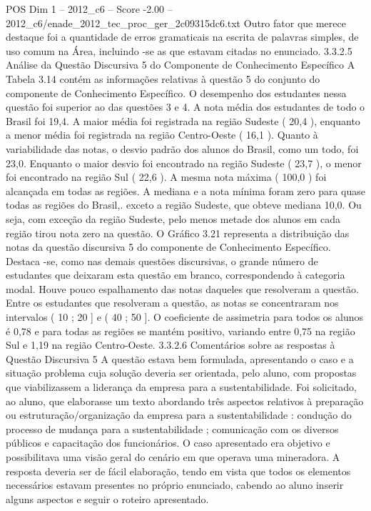 \begin{textsample}{POS Dim 1 – 2012\_c6 – Score -2.00 – 2012\_c6/enade\_2012\_tec\_proc\_ger\_2c09315dc6.txt}
Outro fator que merece destaque foi a quantidade de erros gramaticais na escrita de palavras simples, de uso comum na Área, incluindo -se as que estavam citadas no enunciado. 3.3.2.5 Análise da Questão Discursiva 5 do Componente de Conhecimento Específico A Tabela 3.14 contém as informações relativas à questão 5 do conjunto do componente de Conhecimento Específico.
O desempenho dos estudantes nessa questão foi superior ao das questões 3 e 4.
A nota média dos estudantes de todo o Brasil foi 19,4.
A maior média foi registrada na região Sudeste ( 20,4 ), enquanto a menor média foi registrada na região Centro-Oeste ( 16,1 ).
Quanto à variabilidade das notas, o desvio padrão dos alunos do Brasil, como um todo, foi 23,0.
Enquanto o maior desvio foi encontrado na região Sudeste ( 23,7 ), o menor foi encontrado na região Sul ( 22,6 ).
A mesma nota máxima ( 100,0 ) foi alcançada em todas as regiões.
A mediana e a nota mínima foram zero para quase todas as regiões do Brasil,. exceto a região Sudeste, que obteve mediana 10,0.
Ou seja, com exceção da região Sudeste, pelo menos metade dos alunos em cada região tirou nota zero na questão.
O Gráfico 3.21 representa a distribuição das notas da questão discursiva 5 do componente de Conhecimento Específico.
Destaca -se, como nas demais questões discursivas, o grande número de estudantes que deixaram esta questão em branco, correspondendo à categoria modal.
Houve pouco espalhamento das notas daqueles que resolveram a questão.
Entre os estudantes que resolveram a questão, as notas se concentraram nos intervalos ( 10 ; 20 ] e ( 40 ; 50 ].
O coeficiente de assimetria para todos os alunos é 0,78 e para todas as regiões se mantém positivo, variando entre 0,75 na região Sul e 1,19 na região Centro-Oeste. 3.3.2.6 Comentários sobre as respostas à Questão Discursiva 5 A questão estava bem formulada, apresentando o caso e a situação problema cuja solução deveria ser orientada, pelo aluno, com propostas que viabilizassem a liderança da empresa para a sustentabilidade.
Foi solicitado, ao aluno, que elaborasse um texto abordando três aspectos relativos à preparação ou estruturação/organização da empresa para a sustentabilidade : condução do processo de mudança para a sustentabilidade ; comunicação com os diversos públicos e capacitação dos funcionários.
O caso apresentado era objetivo e possibilitava uma visão geral do cenário em que operava uma mineradora.
A resposta deveria ser de fácil elaboração, tendo em vista que todos os elementos necessários estavam presentes no próprio enunciado, cabendo ao aluno inserir alguns aspectos e seguir o roteiro apresentado.

\end{textsample}
